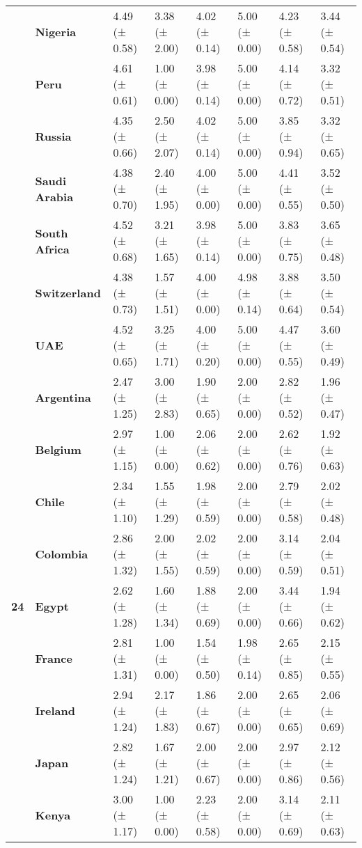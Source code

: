 \begin{tabular}{llllllll}
\textbf{} & \textbf{Nigeria} & 4.49 (± 0.58) & 3.38 (± 2.00) & 4.02 (± 0.14) & 5.00 (± 0.00) & 4.23 (± 0.58) & 3.44 (± 0.54) \\
\textbf{} & \textbf{Peru} & 4.61 (± 0.61) & 1.00 (± 0.00) & 3.98 (± 0.14) & 5.00 (± 0.00) & 4.14 (± 0.72) & 3.32 (± 0.51) \\
\textbf{} & \textbf{Russia} & 4.35 (± 0.66) & 2.50 (± 2.07) & 4.02 (± 0.14) & 5.00 (± 0.00) & 3.85 (± 0.94) & 3.32 (± 0.65) \\
\textbf{} & \textbf{Saudi Arabia} & 4.38 (± 0.70) & 2.40 (± 1.95) & 4.00 (± 0.00) & 5.00 (± 0.00) & 4.41 (± 0.55) & 3.52 (± 0.50) \\
\textbf{} & \textbf{South Africa} & 4.52 (± 0.68) & 3.21 (± 1.65) & 3.98 (± 0.14) & 5.00 (± 0.00) & 3.83 (± 0.75) & 3.65 (± 0.48) \\
\textbf{} & \textbf{Switzerland} & 4.38 (± 0.73) & 1.57 (± 1.51) & 4.00 (± 0.00) & 4.98 (± 0.14) & 3.88 (± 0.64) & 3.50 (± 0.54) \\
\textbf{} & \textbf{UAE} & 4.52 (± 0.65) & 3.25 (± 1.71) & 4.00 (± 0.20) & 5.00 (± 0.00) & 4.47 (± 0.55) & 3.60 (± 0.49) \\
\cline{1-8}
\multirow[t]{19}{*}{\textbf{24}} & \textbf{Argentina} & 2.47 (± 1.25) & 3.00 (± 2.83) & 1.90 (± 0.65) & 2.00 (± 0.00) & 2.82 (± 0.52) & 1.96 (± 0.47) \\
\textbf{} & \textbf{Belgium} & 2.97 (± 1.15) & 1.00 (± 0.00) & 2.06 (± 0.62) & 2.00 (± 0.00) & 2.62 (± 0.76) & 1.92 (± 0.63) \\
\textbf{} & \textbf{Chile} & 2.34 (± 1.10) & 1.55 (± 1.29) & 1.98 (± 0.59) & 2.00 (± 0.00) & 2.79 (± 0.58) & 2.02 (± 0.48) \\
\textbf{} & \textbf{Colombia} & 2.86 (± 1.32) & 2.00 (± 1.55) & 2.02 (± 0.59) & 2.00 (± 0.00) & 3.14 (± 0.59) & 2.04 (± 0.51) \\
\textbf{} & \textbf{Egypt} & 2.62 (± 1.28) & 1.60 (± 1.34) & 1.88 (± 0.69) & 2.00 (± 0.00) & 3.44 (± 0.66) & 1.94 (± 0.62) \\
\textbf{} & \textbf{France} & 2.81 (± 1.31) & 1.00 (± 0.00) & 1.54 (± 0.50) & 1.98 (± 0.14) & 2.65 (± 0.85) & 2.15 (± 0.55) \\
\textbf{} & \textbf{Ireland} & 2.94 (± 1.24) & 2.17 (± 1.83) & 1.86 (± 0.67) & 2.00 (± 0.00) & 2.65 (± 0.65) & 2.06 (± 0.69) \\
\textbf{} & \textbf{Japan} & 2.82 (± 1.24) & 1.67 (± 1.21) & 2.00 (± 0.67) & 2.00 (± 0.00) & 2.97 (± 0.86) & 2.12 (± 0.56) \\
\textbf{} & \textbf{Kenya} & 3.00 (± 1.17) & 1.00 (± 0.00) & 2.23 (± 0.58) & 2.00 (± 0.00) & 3.14 (± 0.69) & 2.11 (± 0.63) \\

\end{tabular}
